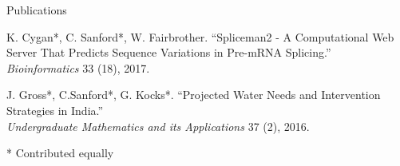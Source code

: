\documentclass{resume} %
\begin{document}
\begin{rSection}{Publications}

K. Cygan*, C. Sanford*, W. Fairbrother. ``Spliceman2 - A Computational Web Server That Predicts Sequence Variations in Pre-mRNA Splicing.'' \\
\textit{Bioinformatics} 33 (18), 2017.

J. Gross*, C.Sanford*, G. Kocks*. ``Projected Water Needs and
Intervention Strategies in India.''\\
\textit{Undergraduate Mathematics and its Applications} 37 (2), 2016.

* Contributed equally
\end{rSection}

\end{document}
